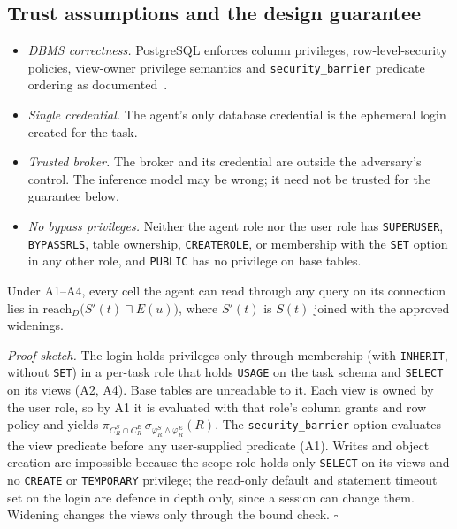 \subsection{Trust assumptions and the design guarantee}
\label{sec:assumptions}
\begin{itemize}
\item[\textbf{A1}] \emph{DBMS correctness.} PostgreSQL enforces column privileges, row-level-security
policies, view-owner privilege semantics and \texttt{security\_barrier} predicate ordering as documented~\cite{pgrls,pgsecbarrier,pggrant}.
\item[\textbf{A2}] \emph{Single credential.} The agent's only database credential is the ephemeral login
created for the task.
\item[\textbf{A3}] \emph{Trusted broker.} The broker and its credential are outside the adversary's
control. The inference model may be wrong; it need not be trusted for the guarantee below.
\item[\textbf{A4}] \emph{No bypass privileges.} Neither the agent role nor the user role has
\texttt{SUPERUSER}, \texttt{BYPASSRLS}, table ownership, \texttt{CREATEROLE}, or membership with the
\texttt{SET} option in any other role, and \texttt{PUBLIC} has no privilege on base tables.
\end{itemize}

\begin{remark}
\label{rem:guarantee}
Under A1--A4, every cell the agent can read through any query on its connection lies in
$\mathrm{reach}_D\big(S'(t)\sqcap E(u)\big)$, where $S'(t)$ is $S(t)$ joined with the approved
widenings.
\end{remark}
\noindent\emph{Proof sketch.} The login holds privileges only through membership (with \texttt{INHERIT},
without \texttt{SET}) in a per-task role that holds \texttt{USAGE} on the task schema and \texttt{SELECT}
on its views (A2, A4). Base tables are unreadable to it. Each view is owned by the user role, so by A1 it is
evaluated with that role's column grants and row policy and yields
$\pi_{C^S_R\cap C^E_R}\,\sigma_{\varphi^S_R\wedge\varphi^E_R}(R)$. The \texttt{security\_barrier}
option evaluates the view predicate before any user-supplied predicate (A1). Writes and object creation
are impossible because the scope role holds only \texttt{SELECT} on its views and no \texttt{CREATE} or
\texttt{TEMPORARY} privilege; the read-only default and statement timeout set on the login are defence in depth
only, since a session can change them. Widening
changes the views only through the bound check. \hfill$\square$

